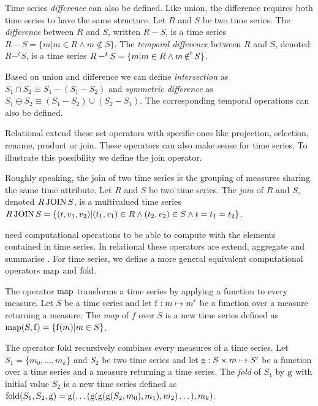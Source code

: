 Time series \emph{difference} can also be defined. Like union, the
difference requires both time series to have the same structure.
%
Let $R$ and $S$ be two time series.
%
The \emph{difference} between $R$ and $S$, written $R-S$, is a time
series $R-S=\{m|m\in R\wedge m\notin S\}$.
%
The \emph{temporal difference} between $R$ and $S$, denoted $R-^t S$, 
is a time series $R-^tS=\{m|m\in R\wedge m \operatorname*{\notin^t} S\}$.


Based on union and difference we can define \emph{intersection} as
$S_1\cap S_2 \equiv S_1 - (S_1 - S_2)$ and \emph{symmetric difference}
as $S_1 \ominus S_2 \equiv (S_1 - S_2) \cup (S_2 - S_1)$. The
corresponding temporal operations can also be defined.



Relational  extend these set operators with specific ones
like projection, selection, rename, product or join. These operators
can also make sense for time series. To illustrate this possibility
we define the join operator.

Roughly speaking, the join of two time series is the grouping of
measures sharing the same time attribute.  Let $R$ and $S$ be two time
series.  The \emph{join} of $R$ and $S$, denoted $R \operatorname*{JOIN} S$, is a
multivalued time series $R \operatorname*{JOIN} S = \{ (t,v_1,v_2) | (t_1,v_1)
\in R\wedge (t_2,v_2) \in S \wedge t=t_1=t_2 \}$.


 need computational operations to be able to compute with
the elements contained in time series. In relational  these
operators are extend, aggregate and summarise
\cite{date:introduction}. For time series, we define a more general
equivalent computational operators $\operatorname*{map}$ and $\operatorname*{fold}$.


The operator $\operatorname*{map}$ transforms a time series by applying a function to
every measure.  Let $S$ be a time series and let $\operatorname*{f} :m \mapsto m'$ be a
function over a measure returning a measure. The \emph{map} of $f$
over $S$ is a new time series defined as $\operatorname*{map}(S,\operatorname*{f}) = \{ \operatorname*{f}(m) | m \in
S\}$.

The operator $\operatorname*{fold}$ recursively combines every measures of a time
series.  Let $S_1=\{m_0, \dotsc, m_k\}$ and $S_2$ be two time series
and let $\operatorname*{g}: S \times m \mapsto S'$ be a function over a time
series and a measure returning a time series. The \emph{fold} of $S_1$
by $\operatorname*{g}$ with initial value $S_2$ is a new time series defined as
$\operatorname*{fold}(S_1,S_2,\operatorname*{g}) = \operatorname*{g}(\dots(
\operatorname*{g}(\operatorname*{g}(\operatorname*{g}(S_2,m_0),\allowbreak m_1),\allowbreak m_2
)\dots),\allowbreak m_k)$. 

